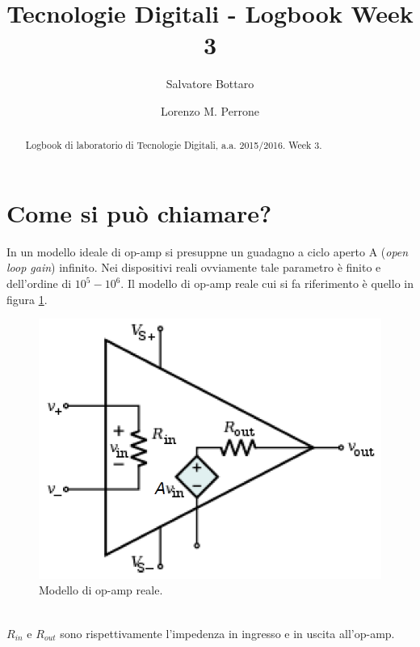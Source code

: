 \documentclass[journal, a4paper]{IEEEtran}
\begin{document}
	\title{Tecnologie Digitali - Logbook Week 3}
	\author[1]{Salvatore Bottaro}
		\author[2]{Lorenzo M. Perrone}
	\maketitle
	
\begin{abstract}
	Logbook di laboratorio di Tecnologie Digitali, a.a. 2015/2016. Week 3.
\end{abstract}

\section{Come si può chiamare?}

In un modello ideale di op-amp si presuppne un guadagno a ciclo aperto A (\textit{open loop gain}) infinito. Nei dispositivi reali ovviamente tale parametro è finito e dell'ordine di $10^5 - 10^6$. Il modello di op-amp reale cui si fa riferimento è quello in figura \ref{fig:op-amp-real}.

\begin{figure}[htp]
\includegraphics[scale=0.4]{op-amp_real}
\caption{Modello di op-amp reale.}
\label{fig:op-amp-real}
\end{figure}
~\\
$R_{in}$ e $R_{out}$ sono rispettivamente l'impedenza in ingresso e in uscita all'op-amp.
 
\end{document}
